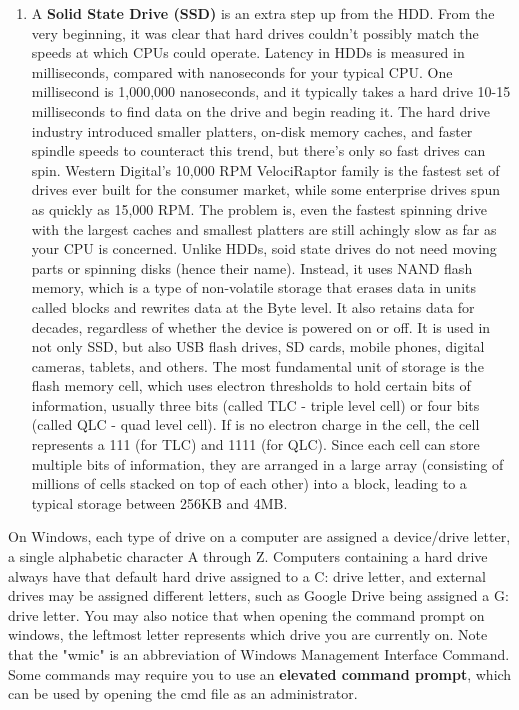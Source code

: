 \documentclass{article}
\begin{document}
\begin{enumerate}
        \item A \textbf{Solid State Drive (SSD)} is an extra step up from the HDD. From the very beginning, it was clear that hard drives couldn’t possibly match the speeds at which CPUs could operate. Latency in HDDs is measured in milliseconds, compared with nanoseconds for your typical CPU. One millisecond is 1,000,000 nanoseconds, and it typically takes a hard drive 10-15 milliseconds to find data on the drive and begin reading it. The hard drive industry introduced smaller platters, on-disk memory caches, and faster spindle speeds to counteract this trend, but there’s only so fast drives can spin. Western Digital’s 10,000 RPM VelociRaptor family is the fastest set of drives ever built for the consumer market, while some enterprise drives spun as quickly as 15,000 RPM. The problem is, even the fastest spinning drive with the largest caches and smallest platters are still achingly slow as far as your CPU is concerned. Unlike HDDs, soid state drives do not need moving parts or spinning disks (hence their name). Instead, it uses NAND flash memory, which is a type of non-volatile storage that erases data in units called blocks and rewrites data at the Byte level. It also retains data for decades, regardless of whether the device is powered on or off. It is used in not only SSD, but also USB flash drives, SD cards, mobile phones, digital cameras, tablets, and others. The most fundamental unit of storage is the flash memory cell, which uses electron thresholds to hold certain bits of information, usually three bits (called TLC - triple level cell) or four bits (called QLC - quad level cell). If is no electron charge in the cell, the cell represents a 111 (for TLC) and 1111 (for QLC). Since each cell can store multiple bits of information, they are arranged in a large array (consisting of millions of cells stacked on top of each other) into a block, leading to a typical storage between 256KB and 4MB.
      \end{enumerate}
      On Windows, each type of drive on a computer are assigned a device/drive letter, a single alphabetic character A through Z. Computers containing a hard drive always have that default hard drive assigned to a C: drive letter, and external drives may be assigned different letters, such as Google Drive being assigned a G: drive letter. You may also notice that when opening the command prompt on windows, the leftmost letter represents which drive you are currently on. Note that the "wmic" is an abbreviation of Windows Management Interface Command. Some commands may require you to use an \textbf{elevated command prompt}, which can be used by opening the cmd file as an administrator. 
\end{document}
